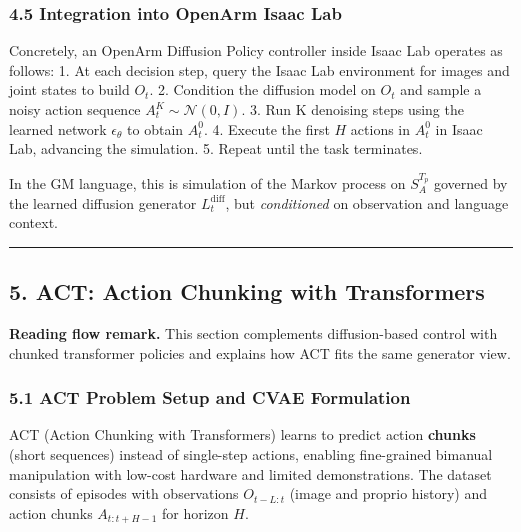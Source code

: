 \documentclass[
]{article}
\theoremstyle{remark}
\begin{document}
\subsubsection{4.5 Integration into OpenArm Isaac
Lab}\label{integration-into-openarm-isaac-lab}

Concretely, an OpenArm Diffusion Policy controller inside Isaac Lab
operates as follows: \cite{act-openarm-notes,diffusion-policy-repo} 1. At each decision step,
query the Isaac Lab environment for images and joint states to build
\(O_t\). 2. Condition the diffusion model on \(O_t\) and sample a noisy
action sequence \(A_t^K \sim \mathcal{N}(0, I)\). 3. Run K denoising
steps using the learned network \(\epsilon_\theta\) to obtain \(A_t^0\).
4. Execute the first \(H\) actions in \(A_t^0\) in Isaac Lab, advancing
the simulation. 5. Repeat until the task terminates.

In the GM language, this is simulation of the Markov process on
\(S_A^{T_p}\) governed by the learned diffusion generator
\(L_t^{\text{diff}}\), but \emph{conditioned} on observation and
language context. \cite{gm-companion-notes,diffpolicy-theory-notes,gm2025}

\begin{center}\rule{0.5\linewidth}{0.5pt}\end{center}

\subsection{5. ACT: Action Chunking with
Transformers}\label{act-action-chunking-with-transformers}

\textbf{Reading flow remark.} This section complements diffusion-based control with chunked transformer policies and explains how ACT fits the same generator view.

\subsubsection{5.1 ACT Problem Setup and CVAE
Formulation}\label{act-problem-setup-and-cvae-formulation}

ACT (Action Chunking with Transformers) learns to predict action
\textbf{chunks} (short sequences) instead of single-step actions,
enabling fine-grained bimanual manipulation with low-cost hardware and
limited demonstrations. The dataset consists of episodes with
observations \(O_{t-L:t}\) (image and proprio history) and action chunks
\(A_{t:t+H-1}\) for horizon
\(H\). \cite{act2023,act-hf-summary,act-project-page,act-openarm-notes}
\end{document}

